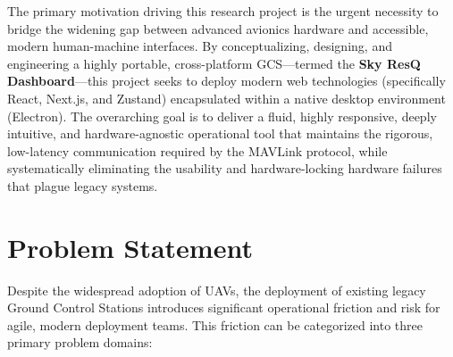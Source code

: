 The primary motivation driving this research project is the urgent necessity to bridge the widening gap between advanced avionics hardware and accessible, modern human-machine interfaces. By conceptualizing, designing, and engineering a highly portable, cross-platform GCS—termed the \textbf{Sky ResQ Dashboard}—this project seeks to deploy modern web technologies (specifically React, Next.js, and Zustand) encapsulated within a native desktop environment (Electron). The overarching goal is to deliver a fluid, highly responsive, deeply intuitive, and hardware-agnostic operational tool that maintains the rigorous, low-latency communication required by the MAVLink protocol, while systematically eliminating the usability and hardware-locking hardware failures that plague legacy systems.

\section{Problem Statement}
Despite the widespread adoption of UAVs, the deployment of existing legacy Ground Control Stations introduces significant operational friction and risk for agile, modern deployment teams. This friction can be categorized into three primary problem domains:

